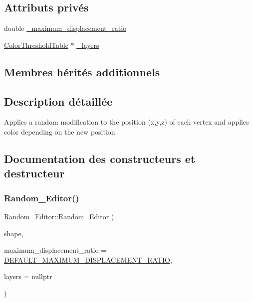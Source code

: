 \subsection*{Attributs privés}
\begin{DoxyCompactItemize}
\item 
double \hyperlink{class_random___editor_a3f94d9732552caff8f645cd077f4743b}{\+\_\+maximum\+\_\+displacement\+\_\+ratio}
\item 
\hyperlink{thresholdtable_8h_ab0deb49d07758f9814993774cb9935cc}{Color\+Threshold\+Table} $\ast$ \hyperlink{class_random___editor_af2105a201bbe9cf3ad46137037a6b69d}{\+\_\+layers}
\end{DoxyCompactItemize}
\subsection*{Membres hérités additionnels}


\subsection{Description détaillée}
Applies a random modification to the position (x,y,z) of each vertex and applies color depending on the new position. 

\subsection{Documentation des constructeurs et destructeur}
\mbox{\label{class_random___editor_a68118d2b9929e7c9dbb821ce76554164}} 
\subsubsection{\texorpdfstring{Random\+\_\+\+Editor()}{Random\_Editor()}}
{\footnotesize\ttfamily Random\+\_\+\+Editor\+::\+Random\+\_\+\+Editor (\begin{DoxyParamCaption}\item[{\hyperlink{class_shape}{Shape} $\ast$}]{shape,  }\item[{double}]{maximum\+\_\+displacement\+\_\+ratio = {\ttfamily \hyperlink{editor_8h_ad4ef0738a1a62405f443237adf55b8c8}{D\+E\+F\+A\+U\+L\+T\+\_\+\+M\+A\+X\+I\+M\+U\+M\+\_\+\+D\+I\+S\+P\+L\+A\+C\+E\+M\+E\+N\+T\+\_\+\+R\+A\+T\+IO}},  }\item[{\hyperlink{thresholdtable_8h_ab0deb49d07758f9814993774cb9935cc}{Color\+Threshold\+Table} $\ast$}]{layers = {\ttfamily nullptr} }\end{DoxyParamCaption})}



